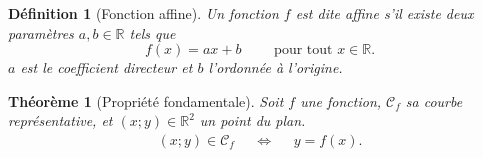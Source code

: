 \documentclass[14pt]{beamer}
\theoremstyle{plain}
\newtheorem*{dfn}{Définition}
\newtheorem*{thm}{Théorème}
\newcommand{\R}{\mathbb{R}}
\newcommand{\C}{\mathcal{C}}
\begin{document}
\begin{frame}

\begin{dfn}[Fonction affine]
	Un fonction $f$ est dite \emph{affine} s'il existe deux paramètres $a,b\in\R$ tels que
		\[ f(x) = ax + b \qquad \text{ pour tout } x\in\R. \]
	$a$ est le \emph{coefficient directeur} et $b$ l'\emph{ordonnée à l'origine}.
\end{dfn}

\begin{thm}[Propriété fondamentale]
	Soit $f$ une fonction, $\C_f$ sa courbe représentative, et $(x;y)\in\R^2$ un point du plan.
		\begin{align*}
			(x;y) \in \C_f && \iff && y = f(x).
		\end{align*}
\end{thm}

\end{frame}
\end{document}
